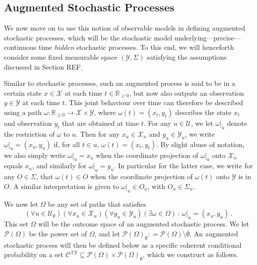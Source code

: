 \documentclass[twoside,11pt]{article}
\newcommand{\reals}{\mathbb{R}}
\newcommand{\realsnonneg}{\reals_{\geq 0}}
\newcommand{\states}{\mathcal{X}}
\newcommand{\observs}{\mathcal{Y}}
\newcommand{\coloneqq}{:\!=}
\begin{document}
\subsection{Augmented Stochastic Processes}\label{sec:aug_stochastic_processes}
We now move on to use this notion of observable models in defining augmented stochastic processes, which will be the stochastic model underlying---precise---continuous time \emph{hidden} stochastic processes. To this end, we will henceforth consider some fixed measurable space $(\observs,\Sigma)$ satisfying the assumptions discussed in Section REF. 

Similar to stochastic processes, such an augmented process is said to be in a certain state $x\in\states$ at each time $t\in\realsnonneg$, but now also outputs an observation $y\in\observs$ at each time $t$. This joint behaviour over time can therefore be described using a path $\omega:\realsnonneg\to\states\times\observs$, where $\omega(t)=(x_t,y_t)$ describes the state $x_t$ and observation $y_t$ that are obtained at time $t$. For any $u\in\mathcal{U}$, we let $\omega\vert_u$ denote the restriction of $\omega$ to $u$. Then for any $x_u\in\states_u$ and $y_u\in\observs_u$, we write $\omega\vert_u=(x_u,y_u)$ if, for all $t\in u$, $\omega(t)=(x_t,y_t)$. By slight abuse of notation, we also simply write $\omega\vert_u=x_u$ when the coordinate projection of $\omega\vert_u$ onto $\states_u$ equals $x_u$, and similarly for $\omega\vert_u=y_u$. In particular for the latter case, we write for any $O\in\Sigma$, that $\omega(t)\in O$ when the coordinate projection of $\omega(t)$ onto $\observs$ is in $O$. A similar interpretation is given to $\omega\vert_u \in O_u$, with $O_u\in\Sigma_u$.

We now let $\Omega$ be any set of paths that satisfies
\begin{equation}\label{eq:paths_big_enough}
(\forall u\in\mathcal{U}_\emptyset)(\forall x_u\in\states_u)(\forall y_u\in\observs_u)(\exists \omega\in\Omega)\,:\,\omega\vert_u=(x_u,y_u)\,.
\end{equation}
This set $\Omega$ will be the outcome space of an augmented stochastic process. We let $\mathcal{P}(\Omega)$ be the power set of $\Omega$, and let $\mathcal{P}(\Omega)_\emptyset\coloneqq \mathcal{P}(\Omega)\setminus\emptyset$. An augmented stochastic process will then be defined below as a specific coherent conditional probability on a set $\mathcal{C}^{\states\observs}\subseteq \mathcal{P}(\Omega)\times \mathcal{P}(\Omega)_\emptyset $, which we construct as follows.
\end{document}
